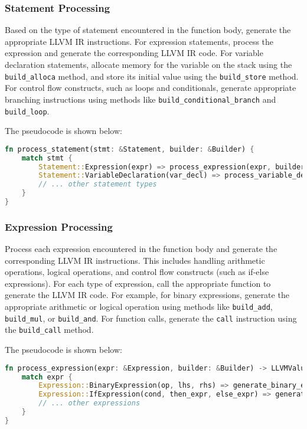 \subsubsection*{Statement Processing}

Based on the type of statement encountered in the function body, generate the appropriate LLVM IR instructions. For expression statements, process the expression and generate the corresponding LLVM IR code. For variable declaration statements, allocate memory for the variable on the stack using the \texttt{build\_alloca} method, and store its initial value using the \texttt{build\_store} method. For control flow constructs, such as loops and conditionals, generate appropriate branching instructions using methods like \texttt{build\_conditional\_branch} and \texttt{build\_loop}.

The pseudocode is shown below:

\begin{lstlisting}[language=Rust]
  fn process_statement(stmt: &Statement, builder: &Builder) {
    match stmt {
        Statement::Expression(expr) => process_expression(expr, builder),
        Statement::VariableDeclaration(var_decl) => process_variable_declaration(var_decl, builder),
        // ... other statement types
    }
}
\end{lstlisting}

\subsubsection*{Expression Processing}

Process each expression encountered in the function body and generate the corresponding LLVM IR instructions. This includes handling arithmetic operations, logical operations, and control flow constructs (such as if-else expressions). For each type of expression, call the appropriate function to generate the LLVM IR code. For example, for binary expressions, generate the appropriate arithmetic or logical operation using methods like \texttt{build\_add}, \texttt{build\_mul}, or \texttt{build\_and}. For function calls, generate the \texttt{call} instruction using the \texttt{build\_call} method.


The pseudocode is shown below:

\begin{lstlisting}[language=Rust]
  fn process_expression(expr: &Expression, builder: &Builder) -> LLVMValue {
    match expr {
        Expression::BinaryExpression(op, lhs, rhs) => generate_binary_expression(op, lhs, rhs, builder),
        Expression::IfExpression(cond, then_expr, else_expr) => generate_if_expression(cond, then_expr, else_expr, builder),
        // ... other expressions
    }
}
\end{lstlisting}

